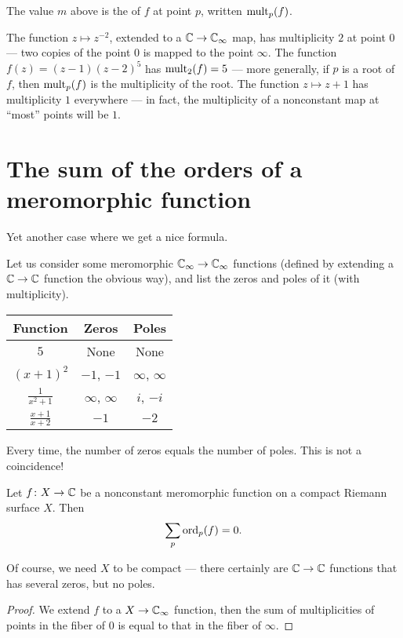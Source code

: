 \begin{definition}
	The value $m$ above is the  of $f$ at point $p$, written $\operatorname{mult}_p(f)$.
\end{definition}

\begin{example}
	\begin{itemize}
		\ii The function $z \mapsto z^{-2}$, extended to a $\mathbb C \to \mathbb C_\infty$ map,
		has multiplicity $2$ at point $0$ --- two copies of the point $0$ is mapped to the point
		$\infty$.
		\ii The function $f(z) = (z-1) (z-2)^5$ has $\operatorname{mult}_2(f) = 5$ --- more generally,
		if $p$ is a root of $f$, then $\operatorname{mult}_p(f)$ is the multiplicity of the root.
		\ii The function $z \mapsto z + 1$ has multiplicity $1$ everywhere --- in fact,
		the multiplicity of a nonconstant map at ``most'' points will be $1$.
	\end{itemize}
\end{example}

\section{The sum of the orders of a meromorphic function}

Yet another case where we get a nice formula.
\begin{example}
	Let us consider some meromorphic $\mathbb C_\infty \to \mathbb C_\infty$ functions (defined by extending a
	$\mathbb C \to \mathbb C$ function the obvious way), and list the zeros and poles of it (with
	multiplicity).
	\begin{center}
	\begin{tabular}{ccc}
		Function & Zeros & Poles \\ \hline
		$5$ & None & None \\
		$(x+1)^2$ & $-1$, $-1$ & $\infty$, $\infty$ \\
		$\frac{1}{x^2+1}$ & $\infty$, $\infty$ & $i$, $-i$ \\
		$\frac{x+1}{x+2}$ & $-1$ & $-2$
	\end{tabular}
	\end{center}
\end{example}
Every time, the number of zeros equals the number of poles. This is not a coincidence!
\begin{proposition}
	Let $f \colon X \to \mathbb C$ be a nonconstant meromorphic function on a compact Riemann surface $X$.
	Then \[\sum_p \operatorname{ord}_p(f) = 0. \]
\end{proposition}
Of course, we need $X$ to be compact --- there certainly are $\mathbb C \to \mathbb C$ functions that has
several zeros, but no poles.
\begin{proof}
	We extend $f$ to a $X \to \mathbb C_\infty$ function, then the sum of multiplicities of points in the
	fiber of $0$ is equal to that in the fiber of $\infty$.
\end{proof}

